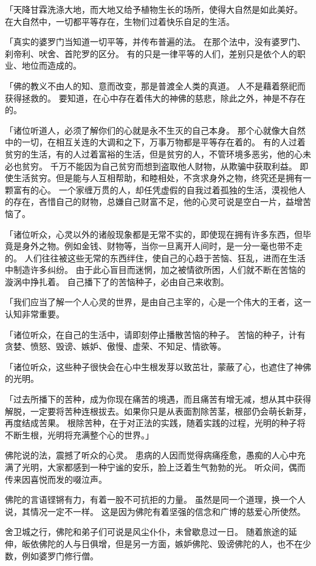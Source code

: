 \documentclass[twoside,openany]{book}
\begin{document}
「天降甘霖洗涤大地，而大地又给予植物生长的场所，使得大自然是如此美好。
在大自然中，一切都平等存在，生物们过着快乐自足的生活。

「真实的婆罗门当知道一切平等，并传布普遍的法。
在那个法中，没有婆罗门、刹帝利、吠舍、首陀罗的区分。
有的只是一律平等的人们，差别只是依个人的职业、地位而造成的。

「佛的教义不由人的知、意而改变，那是普渡全人类的真道。
人不是藉着祭祀而获得拯救的。
要知道，在心中存在着伟大的神佛的慈悲，除此之外，神是不存在的。

「诸位听道人，必须了解你们的心就是永不生灭的自己本身。
那个心就像大自然中的一切，在相互关连的大调和之下，万事万物都是平等存在着的。
有的人过着贫穷的生活，有的人过着富裕的生活，但是贫穷的人，不管环境多恶劣，他的心未必也贫穷。
千万不能因为自己贫穷而想到盗取他人财物，从欺骗中获取利益。
即使生活贫穷。但是能与人互相帮助，和睦相处，不贪求身外之物，终究还是拥有一颗富有的心。
一个家缠万贯的人，却任凭虚假的自我过着孤独的生活，漠视他人的存在，吝惜自己的财物，总嫌自己财富不足，他的心灵可说是空白一片，益增苦恼了。

「诸位听众，心灵以外的诸般现象都是无常不实的，即使现在拥有许多东西，但毕竟是身外之物。例如金钱、财物等，当你一旦离开人间时，是一分一毫也带不走的。
人们往往被这些无常的东西绊住，使自己的心趋于苦恼、狂乱，进而在生活中制造许多纠纷。
由于此心盲目而迷惘，加之被情欲所困，人们就不断在苦恼的漩涡中挣扎着。
自己播下了的苦恼种子，必由自己来收割。

「我们应当了解一个人心灵的世界，是由自己主宰的，心是一个伟大的王者，这一认知非常重要。

「诸位听众，在自己的生活中，请即刻停止播散苦恼的种子。
苦恼的种子，计有贪婪、愤怒、毁谤、嫉妒、傲慢、虚荣、不知足、情欲等。

「诸位听众，这些种子很快会在心中生根发芽以致茁壮，蒙蔽了心，也遮住了神佛的光明。

「过去所播下的苦种，成为你现在痛苦的境遇，而且痛苦有增无减，想从其中获得解脱，一定要将苦种连根拔去。如果你只是从表面割除苦茎，根部仍会萌长新芽，再度结成苦果。
根除苦种，在于对正法的实践，随着实践的过程，光明的种子将不断生根，光明将充满整个心的世界。」

佛陀说的法，震撼了听众的心灵。
患病的人因而觉得病痛痊愈，愚痴的人心中充满了光明，大家都感到一种宁谧的安乐，脸上泛着生气勃勃的光。
听众间，偶而传来因喜悦而发的啜泣声。

佛陀的言语铿锵有力，有着一股不可抗拒的力量。
虽然是同一个道理，换一个人说，其情况一定不一样。
这是因为佛陀有着坚强的信念和广博的慈爱心所使然。

舍卫城之行，佛陀和弟子们可说是风尘仆仆，未曾歇息过一日。
随着旅途的延伸，皈依佛陀的人与日俱增，但是另一方面，嫉妒佛陀、毁谤佛陀的人，也不在少数，例如婆罗门修行僧。
\end{document}
